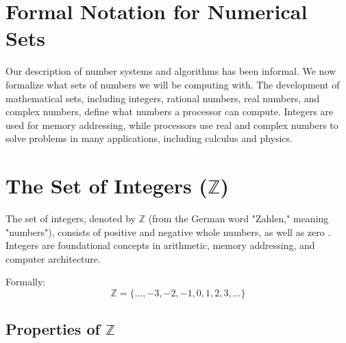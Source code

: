 \section{Formal Notation for Numerical Sets}
Our description of number systems and algorithms has been informal. We now formalize what sets of numbers we will be computing with. The development of mathematical sets, including integers, rational numbers, real numbers, and complex numbers, define what numbers a processor can compute. Integers are used for memory addressing, while processors use real and complex numbers to solve problems in many applications, including calculus and physics. 

\section{The Set of Integers (\( \mathbb{Z} \))}
The set of integers, denoted by \( \mathbb{Z} \) (from the German word "Zahlen," meaning "numbers"), consists of positive and negative whole numbers, as well as zero \cite{knuth1997}. Integers are foundational concepts in arithmetic, memory addressing, and computer architecture.

Formally:
\[
\mathbb{Z} = \{\dots, -3, -2, -1, 0, 1, 2, 3, \dots\}
\]

\subsection{Properties of $\mathbb{Z}$}

